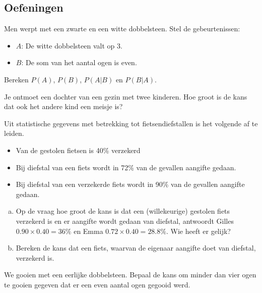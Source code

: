 \documentclass[12pt,twoside]{article}
\begin{document}
\subsection{Oefeningen}

\begin{oefening}
Men werpt met een zwarte en een witte dobbelsteen. Stel de gebeurtenissen:
\begin{itemize}
\item $A$: De witte dobbelsteen valt op 3.
\item $B$: De som van het aantal ogen is even.
\end{itemize}
Bereken $P(A)$, $P(B)$, $P(A|B)$ en $P(B|A)$.
\end{oefening}

\begin{oefening}
Je ontmoet een dochter van een gezin met twee kinderen. Hoe groot is de kans dat ook het andere kind een meisje is?
\end{oefening}

\begin{oefening} %
Uit statistische gegevens met betrekking tot fietsendiefstallen is het volgende af te leiden.
\begin{itemize}
  \item Van de gestolen fietsen is 40\% verzekerd
  \item Bij diefstal van een fiets wordt in 72\% van de gevallen aangifte gedaan.
  \item Bij diefstal van een verzekerde fiets wordt in 90\% van de gevallen aangifte gedaan.
\end{itemize}
\begin{enumerate}[(a)]
  \item Op de vraag hoe groot de kans is dat een (willekeurige) gestolen fiets verzekerd is en er aangifte wordt gedaan van diefstal, antwoordt Gilles $0.90\times0.40 = 36\%$ en Emma $0.72\times0.40 = 28.8\%$. Wie heeft er gelijk?
  \item Bereken de kans dat een fiets, waarvan de eigenaar aangifte doet van diefstal, verzekerd is.
\end{enumerate}
\end{oefening}

\begin{oefening}
We gooien met een eerlijke dobbelsteen. Bepaal de kans om minder dan vier ogen te gooien gegeven dat er een even aantal ogen gegooid werd.
\end{oefening}
\end{document}
